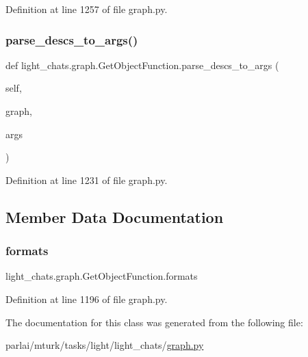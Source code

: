 Definition at line 1257 of file graph.\+py.

\mbox{\label{classlight__chats_1_1graph_1_1GetObjectFunction_a2854af16c5150dcd6a39176fefc3d536}} 
\subsubsection{\texorpdfstring{parse\+\_\+descs\+\_\+to\+\_\+args()}{parse\_descs\_to\_args()}}
{\footnotesize\ttfamily def light\+\_\+chats.\+graph.\+Get\+Object\+Function.\+parse\+\_\+descs\+\_\+to\+\_\+args (\begin{DoxyParamCaption}\item[{}]{self,  }\item[{}]{graph,  }\item[{}]{args }\end{DoxyParamCaption})}



Definition at line 1231 of file graph.\+py.



\subsection{Member Data Documentation}
\mbox{\label{classlight__chats_1_1graph_1_1GetObjectFunction_a726f8b3315bfedc530da445bb3e135e6}} 
\subsubsection{\texorpdfstring{formats}{formats}}
{\footnotesize\ttfamily light\+\_\+chats.\+graph.\+Get\+Object\+Function.\+formats}



Definition at line 1196 of file graph.\+py.



The documentation for this class was generated from the following file\+:\begin{DoxyCompactItemize}
\item 
parlai/mturk/tasks/light/light\+\_\+chats/\hyperlink{parlai_2mturk_2tasks_2light_2light__chats_2graph_8py}{graph.\+py}\end{DoxyCompactItemize}
